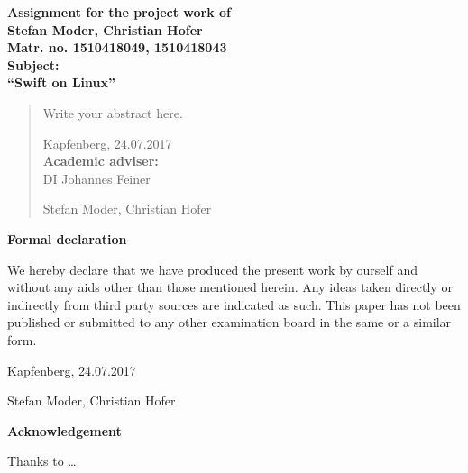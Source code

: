 \begin{titlepage}

\begin{center}\large\bf
Assignment for the project work of\\
Stefan Moder, Christian Hofer\\
Matr. no. 1510418049, 1510418043
\\[2ex]
Subject:\\
``Swift on Linux''
\end{center}

\begin{abstract}
Write your abstract here.

Kapfenberg, 24.07.2017\\[1.5ex]
{\bf Academic adviser:}\\
DI Johannes Feiner

\flushright
\vspace{15mm}
Stefan Moder, Christian Hofer
\end{abstract}

\end{titlepage}



\chapterend

\begin{titlepage}


\begin{center}\large\bf
Formal declaration
\end{center}

We hereby declare that we have produced the present work by ourself and without any aids other than those mentioned herein. Any ideas taken directly or indirectly from third party sources are indicated as such. This paper has not been published or submitted to any other examination board in the same or a similar form.

\vspace{1,5cm}
Kapfenberg, 24.07.2017

\flushright
\vspace{15mm}
Stefan Moder, Christian Hofer

\end{titlepage}



\chapterend

\begin{titlepage}

\begin{center}\large\bf
Acknowledgement
\end{center}
Thanks to \ldots

\end{titlepage}



\chapterend
